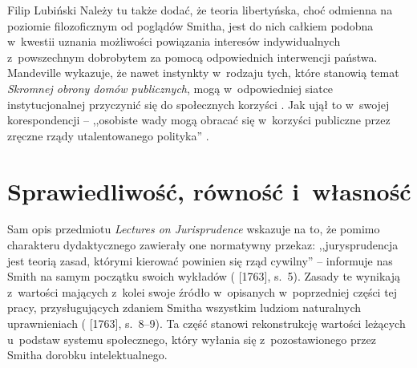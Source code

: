 \begin{artplenv}{Filip Lubiński}
 Należy tu także dodać, że teoria libertyńska, choć odmienna na poziomie filozoficznym od poglądów Smitha, jest do
nich całkiem podobna w~kwestii uznania możliwości powiązania interesów indywidualnych z~powszechnym dobrobytem za
pomocą odpowiednich interwencji państwa. Mandeville wykazuje, że nawet instynkty w~rodzaju tych, które stanowią temat
\textit{Skromnej obrony domów publicznych}, mogą w~odpowiedniej siatce instytucjonalnej przyczynić się do społecznych
korzyści
\parencite{mandeville_skromna_2016}.
Jak ujął to w~swojej korespondencji -- ,,osobiste wady mogą obracać
się w~korzyści publiczne przez zręczne rządy utalentowanego polityka''
\parencite[ s.~37]{mandeville_letter_1953}.

\section{Sprawiedliwość, równość i~własność}
Sam opis przedmiotu \textit{Lectures on Jurisprudence} wskazuje na to, że pomimo charakteru dydaktycznego zawierały
one normatywny przekaz: ,,jurysprudencja jest teorią zasad, którymi kierować powinien się rząd cywilny'' -- informuje nas
Smith na samym początku swoich wykładów
(\cite{smith_lectures_1982} [1763], s.~5).
Zasady te
wynikają z~wartości mających z~kolei swoje źródło w~opisanych w~poprzedniej części tej pracy, przysługujących zdaniem Smitha
wszystkim ludziom naturalnych uprawnieniach
(\cite{smith_lectures_1982} [1763], s.~8--9).
Ta część stanowi
rekonstrukcję wartości leżących u~podstaw systemu społecznego, który wyłania się z~pozostawionego przez Smitha dorobku
intelektualnego.


\end{artplenv}
